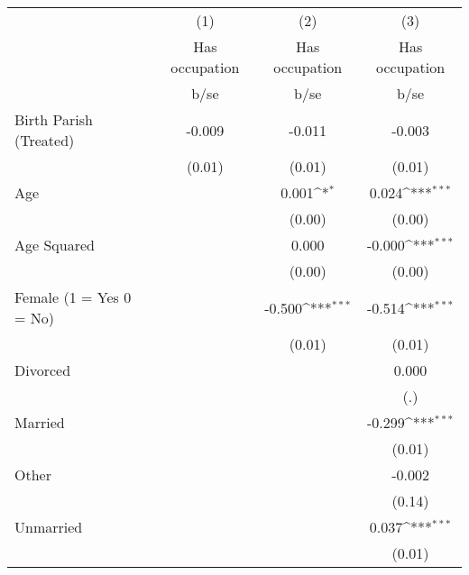 {
\def\sym#1{\ifmmode^{#1}\else\(^{#1}\)\fi}
\begin{tabular}{l*{3}{c}}
\hline\hline
                    &\multicolumn{1}{c}{(1)}&\multicolumn{1}{c}{(2)}&\multicolumn{1}{c}{(3)}\\
                    &\multicolumn{1}{c}{Has occupation}&\multicolumn{1}{c}{Has occupation}&\multicolumn{1}{c}{Has occupation}\\
                    &        b/se         &        b/se         &        b/se         \\
\hline
Birth Parish (Treated)&      -0.009         &      -0.011         &      -0.003         \\
                    &      (0.01)         &      (0.01)         &      (0.01)         \\
Age                 &                     &       0.001\sym{*}  &       0.024\sym{***}\\
                    &                     &      (0.00)         &      (0.00)         \\
Age Squared         &                     &       0.000         &      -0.000\sym{***}\\
                    &                     &      (0.00)         &      (0.00)         \\
Female (1 = Yes 0 = No)&                     &      -0.500\sym{***}&      -0.514\sym{***}\\
                    &                     &      (0.01)         &      (0.01)         \\
Divorced            &                     &                     &       0.000         \\
                    &                     &                     &         (.)         \\
Married             &                     &                     &      -0.299\sym{***}\\
                    &                     &                     &      (0.01)         \\
Other               &                     &                     &      -0.002         \\
                    &                     &                     &      (0.14)         \\
Unmarried           &                     &                     &       0.037\sym{***}\\
                    &                     &                     &      (0.01)         \\

\end{tabular}}

